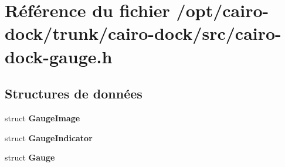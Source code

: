 \section{Référence du fichier /opt/cairo-dock/trunk/cairo-dock/src/cairo-dock-gauge.h}
\label{cairo-dock-gauge_8h}
\subsection*{Structures de données}
\begin{CompactItemize}
\item 
struct {\bf GaugeImage}
\item 
struct {\bf GaugeIndicator}
\item 
struct {\bf Gauge}
\end{CompactItemize}

